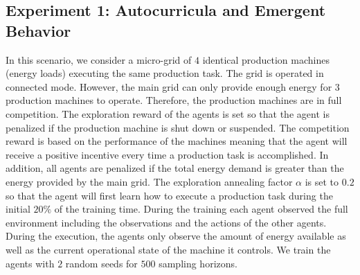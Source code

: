 \subsection{Experiment 1: Autocurricula and Emergent Behavior}
\label{subsec:51}
In this scenario, we consider a micro-grid of $4$ identical production machines (energy loads) executing the same production task. The grid is operated in connected mode. However, the main grid can only provide enough energy for $3$ production machines to operate. Therefore, the production machines are in full competition. The exploration reward of the agents is set so that the agent is penalized if the production machine is shut down or suspended. The competition reward is based on the performance of the machines meaning that the agent will receive a positive incentive every time a production task is accomplished. In addition, all agents are penalized if the total energy demand is greater than the energy provided by the main grid. The exploration annealing factor $\alpha$ is set to $0.2$ so that the agent will first learn how to execute a production task during the initial $20\%$ of the training time. During the training each agent observed the full environment including the observations and the actions of the other agents. During the execution, the agents only observe the amount of energy available as well as the current operational state of the machine it controls. We train the agents with $2$ random seeds for $500$ sampling horizons.

